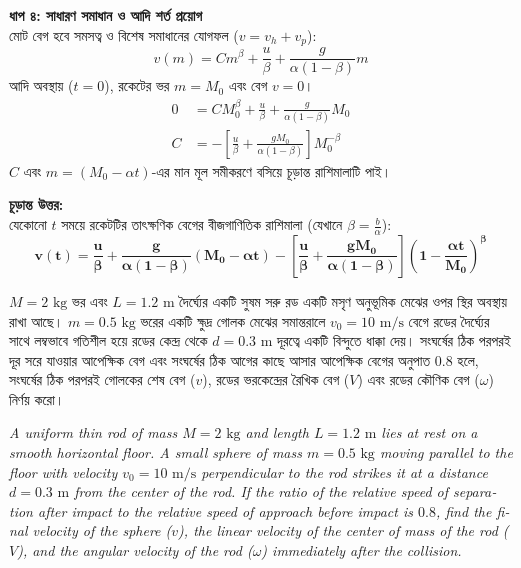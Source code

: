 \documentclass[12pt, a4paper]{article}
\begin{document}
\begin{tcolorbox}[solutionbox={সমাধান (Solution)}]
\vspace{0.5em}
\noindent
\textbf{ধাপ ৪: সাধারণ সমাধান ও আদি শর্ত প্রয়োগ} \\
মোট বেগ হবে সমসত্ব ও বিশেষ সমাধানের যোগফল ($v = v_h + v_p$):
\[ v(m) = C m^\beta + \frac{u}{\beta} + \frac{g}{\alpha(1 - \beta)} m \]
আদি অবস্থায় ($t = 0$), রকেটের ভর $m = M_0$ এবং বেগ $v = 0$।
\begin{align*}
    0 &= C M_0^\beta + \frac{u}{\beta} + \frac{g}{\alpha(1 - \beta)} M_0 \\
    C &= -\left[ \frac{u}{\beta} + \frac{g M_0}{\alpha(1 - \beta)} \right] M_0^{-\beta}
\end{align*}
$C$ এবং $m = (M_0 - \alpha t)$-এর মান মূল সমীকরণে বসিয়ে চূড়ান্ত রাশিমালাটি পাই।

\vspace{1em}
\begin{tcolorbox}[answerbox]
\textbf{চূড়ান্ত উত্তর:} \\
যেকোনো $t$ সময়ে রকেটটির তাৎক্ষণিক বেগের বীজগাণিতিক রাশিমালা (যেখানে $\beta = \frac{b}{\alpha}$):
\[ \mathbf{v(t) = \frac{u}{\beta} + \frac{g}{\alpha(1 - \beta)} (M_0 - \alpha t) - \left[ \frac{u}{\beta} + \frac{g M_0}{\alpha(1 - \beta)} \right] \left( 1 - \frac{\alpha t}{M_0} \right)^{\beta}} \]
\end{tcolorbox}
\end{tcolorbox}

\begin{tcolorbox}[questionbox={প্রশ্ন (Question) 2}]
\noindent
$M = 2\text{ kg}$ ভর এবং $L = 1.2\text{ m}$ দৈর্ঘ্যের একটি সুষম সরু রড একটি মসৃণ অনুভূমিক মেঝের ওপর স্থির অবস্থায় রাখা আছে। $m = 0.5\text{ kg}$ ভরের একটি ক্ষুদ্র গোলক মেঝের সমান্তরালে $v_0 = 10\text{ m/s}$ বেগে রডের দৈর্ঘ্যের সাথে লম্বভাবে গতিশীল হয়ে রডের কেন্দ্র থেকে $d = 0.3\text{ m}$ দূরত্বে একটি বিন্দুতে ধাক্কা দেয়। সংঘর্ষের ঠিক পরপরই দূর সরে যাওয়ার আপেক্ষিক বেগ এবং সংঘর্ষের ঠিক আগের কাছে আসার আপেক্ষিক বেগের অনুপাত $0.8$ হলে, সংঘর্ষের ঠিক পরপরই গোলকের শেষ বেগ ($v$), রডের ভরকেন্দ্রের রৈখিক বেগ ($V$) এবং রডের কৌণিক বেগ ($\omega$) নির্ণয় করো।

\vspace{0.8em}
\begin{english}
\noindent\textit{\color{darkgray}
A uniform thin rod of mass $M = 2\text{ kg}$ and length $L = 1.2\text{ m}$ lies at rest on a smooth horizontal floor. A small sphere of mass $m = 0.5\text{ kg}$ moving parallel to the floor with velocity $v_0 = 10\text{ m/s}$ perpendicular to the rod strikes it at a distance $d = 0.3\text{ m}$ from the center of the rod. If the ratio of the relative speed of separation after impact to the relative speed of approach before impact is $0.8$, find the final velocity of the sphere ($v$), the linear velocity of the center of mass of the rod ($V$), and the angular velocity of the rod ($\omega$) immediately after the collision.
}
\end{english}
\end{tcolorbox}
\end{document}
